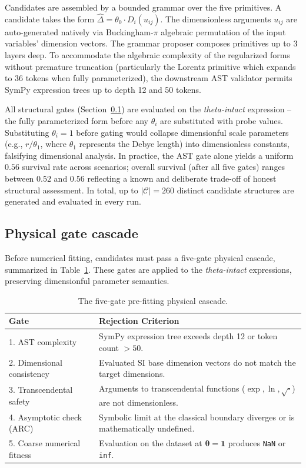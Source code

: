 ﻿\documentclass{article}
\begin{document}
Candidates are assembled by a bounded grammar over the five primitives.
A candidate takes the form $\hat{\Delta} = \theta_0 \cdot D_i(u_{ij})$. The dimensionless arguments $u_{ij}$ are auto-generated natively via Buckingham-$\pi$ algebraic permutation of the input variables' dimension vectors.
The grammar proposer composes primitives up to 3 layers deep.
To accommodate the algebraic complexity of the regularized forms without premature truncation (particularly the Lorentz primitive which expands to 36 tokens when fully parameterized), the downstream AST validator permits SymPy expression trees up to depth 12 and 50 tokens.

All structural gates (Section~\ref{sec:gates}) are evaluated on the
\emph{theta-intact} expression -- the fully parameterized form before any
$\theta_i$ are substituted with probe values.
Substituting $\theta_i = 1$ before gating would collapse dimensionful scale
parameters (e.g., $r/\theta_1$, where $\theta_1$ represents the Debye length)
into dimensionless constants, falsifying dimensional analysis.
In practice, the AST gate alone yields a uniform $0.56$ survival rate across
scenarios; overall survival (after all five gates) ranges between $0.52$ and $0.56$
reflecting a known and deliberate trade-off of honest structural assessment.
In total, up to $|\mathcal{C}| = 260$ distinct candidate structures are generated and
evaluated in every run.

\subsection{Physical gate cascade}
\label{sec:gates}

Before numerical fitting, candidates must pass a five-gate physical cascade, summarized in Table~\ref{tab:gates}. These gates are applied to the \emph{theta-intact} expressions, preserving dimensionful parameter semantics.

\begin{table}[ht]
\small
\caption{The five-gate pre-fitting physical cascade.}
\label{tab:gates}
\centering
\begin{tabular}{@{}p{3.5cm}p{9cm}@{}}
\toprule
Gate & Rejection Criterion \\
\midrule
1. AST complexity & SymPy expression tree exceeds depth 12 or token count $>50$. \\
2. Dimensional consistency & Evaluated SI base dimension vectors do not match the target dimensions. \\
3. Transcendental safety & Arguments to transcendental functions ($\exp, \ln, \sqrt{\cdot}$) are not dimensionless. \\
4. Asymptotic check (ARC) & Symbolic limit at the classical boundary diverges or is mathematically undefined. \\
5. Coarse numerical fitness & Evaluation on the dataset at $\boldsymbol{\theta} = \mathbf{1}$ produces \texttt{NaN} or \texttt{inf}. \\
\bottomrule
\end{tabular}
\end{table}
\end{document}
